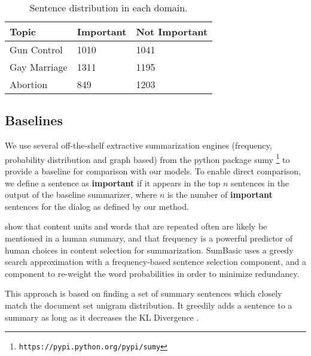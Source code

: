 \documentclass[11pt]{article}
\begin{document}
\begin{table}[!htb]
\begin{center}
\begin{small}
\begin{tabular}{|p{1.9cm}||p{1.6cm}| p{1.9cm} | }
\hline
Topic & Important  & Not Important   \\ \hline
Gun Control & 1010 & 1041 \\ \hline
Gay Marriage & 1311    & 1195    \\ \hline
Abortion &   849   & 1203   \\ \hline
\end{tabular}
\caption{\label{tab-corpus-statistics}
Sentence distribution in each domain. }
\end{small}
\end{center}
\vspace{-.2in}
\end{table}


\subsection{Baselines}

We use several off-the-shelf extractive summarization engines
(frequency, probability distribution and graph based) from the python package sumy 
\footnote{{\small {\tt https://pypi.python.org/pypi/sumy}}} to provide
a baseline for comparison with our models.  To enable direct
comparison, we define a sentence as \textbf{important} if it appears
in the top $n$ sentences in the output of the baseline summarizer,
where $n$ is the number of \textbf{important} sentences for the
dialog as defined by our method.
 
  show that
content units and words that are repeated often are 
likely be mentioned in a human summary, and that frequency is a
powerful predictor of human choices in content selection for
summarization. SumBasic uses a greedy search approximation with a
frequency-based sentence selection component, and a component to
re-weight the word probabilities in order to minimize
redundancy. 

 This approach is based on
finding a set of summary sentences which closely match the document
set unigram distribution. It greedily adds a sentence to a summary as
long as it decreases the KL Divergence  \cite{Haghighi2009}.
\end{document}
